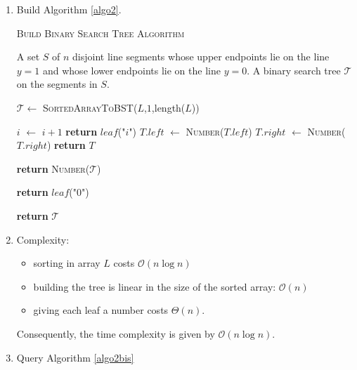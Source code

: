 \documentclass[11pt]{article}
\begin{document}
\begin{enumerate}
    \item Build Algorithm \ref{algo2}.
    
    \begin{algorithm}[ht!]
    \caption{\textsc{Build Binary Search Tree Algorithm}}
    \label{algo2}
    \begin{algorithmic}[1]

    \Require A set $S$ of $n$ disjoint line segments whose upper endpoints lie on the line $y=1$ and whose lower endpoints lie on the line $y=0$.
    \Ensure A binary search tree $\mathcal{T}$ on the segments in $S$.
    
    
    \State $ \mathcal{T}\gets $ \textsc{SortedArrayToBST}($L$,$1$,length($L$)) 
    
    
                  
            \State $i$ $\gets$ $i+1$
            \State \textbf{return} $leaf$("$i$")
        \Else 
            \State $T.left$ $\gets$ \textsc{Number}($T.left$)
            \State $T.right$ $\gets$ \textsc{Number}($T.right$)
            \State \textbf{return} $T$
        \EndIf
    \EndFunction
    
    \State \textbf{return} \textsc{Number}($\mathcal{T}$)
    
    \EndFunction
    
    
        \State \textbf{return} $leaf$("$0$")
    \EndIf
    
    \State \textbf{return} $\mathcal{T}$
    \EndFunction
    
    \end{algorithmic}
    \end{algorithm}
    
    \item Complexity: 
    \begin{itemize}
        \item sorting in array $L$ costs $\mathcal{O}(n \log n)$
        \item building the tree is linear in the size of the sorted array: $\mathcal{O}(n)$
        \item  giving each leaf a number costs $\Theta(n)$. 
    \end{itemize}
    Consequently, the time complexity is given by $\mathcal{O}(n \log n)$. 
    \item Query Algorithm \ref{algo2bis}
    

\end{enumerate}
\end{document}
